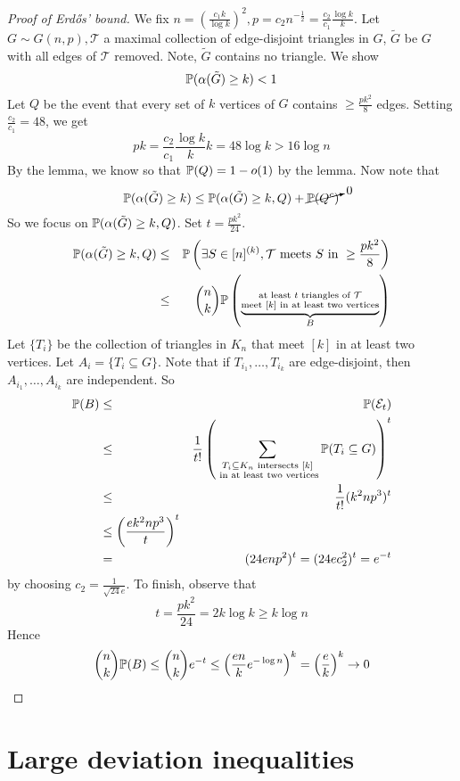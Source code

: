 \documentclass{article}
\begin{document}
\begin{proof}[Proof of Erd\H os' bound]
  We fix $n = \left(\frac{c_1 k}{\log k}\right)^2, p = c_2n^{-\frac 12} = \frac{c_2}{c_1}\frac{\log k}k$. Let $G \sim G(n, p), \mathcal T$ a maximal collection of edge-disjoint triangles in $G$, $\tilde G$ be $G$ with all edges of $\mathcal T$ removed. Note, $\tilde G$ contains no triangle. We show
  $$\P(\alpha(\tilde G) \ge k) < 1$$
  Let $Q$ be the event that every set of $k$ vertices of $G$ contains $\ge \frac{pk^2}8$ edges. Setting $\frac{c_2}{c_1} = 48$, we get
  $$pk = \frac{c_2}{c_1}\frac{\log k}k k = 48\log k > 16\log n$$ By the lemma, we know so that $\P(Q) = 1 - o(1)$ by the lemma. Now note that
  $$\P(\alpha(\tilde G) \ge k) \le \P(\alpha(\tilde G) \ge k, Q) + \cancelto 0{\P(Q^c)}$$
  So we focus on $\P(\alpha(\tilde G) \ge k, Q)$. Set $t = \frac{pk^2}{24}$.
  \begin{eqnarray*}
    \P(\alpha(\tilde G) \ge k, Q)
    & \le & \P\left(\exists S \in [n]^{(k)}, \mathcal T \text{ meets $S$ in } \ge \frac{pk^2}8\right) \\
    & \le & \binom n k \P\left(\underbrace{\substack{\text{at least $t$ triangles of $\mathcal T$} \\ \text{meet $[k]$ in at least two vertices}}}_B\right)
  \end{eqnarray*}
  Let $\{T_i\}$ be the collection of triangles in $K_n$ that meet $[k]$ in at least two vertices. Let $A_i = \{T_i \subseteq G\}$. Note that if $T_{i_1}, \dots, T_{i_k}$ are edge-disjoint, then $A_{i_1}, \dots, A_{i_k}$ are independent. So
  \begin{eqnarray*}
    \P(B)
    & \le & \P(\Eps_t) \\
    & \le & \frac 1{t!}\left(\sum_{\substack{T_i \subseteq K_n \text{ intersects } [k] \\ \text{ in at least two vertices}}} \P(T_i \subseteq G)\right)^t \\
    & \le & \frac 1{t!} (k^2np^3)^t \\
    & \le \left(\frac{ek^2np^3}t\right)^t \\
    & = & (24enp^2)^t = (24ec_2^2)^t = e^{-t}
  \end{eqnarray*}
  by choosing $c_2 = \frac 1{\sqrt{24} e}$. To finish, observe that
  $$t = \frac{pk^2}{24} = 2k\log k \ge k\log n$$
  Hence
  $$\binom n k \P(B) \le \binom n k e^{-t} \le \left(\frac{en}k e^{-\log n}\right)^k = \left(\frac ek\right)^k \mor 0$$
\end{proof}


\section{Large deviation inequalities}
\end{document}
